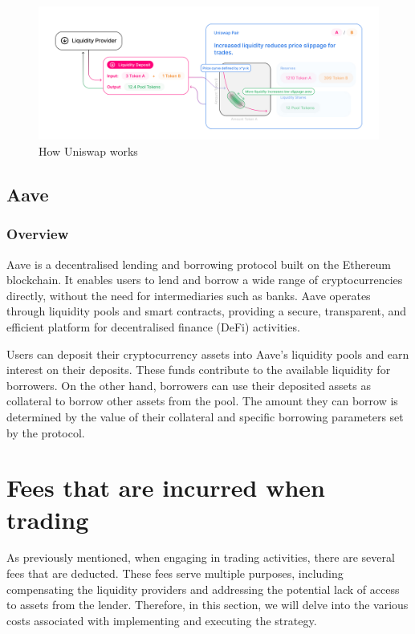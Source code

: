 \begin{figure}[!htb]
    \centering
    \includegraphics[width=\textwidth]{background/Images/uniswap_lp.jpeg}
    \caption{How Uniswap works~\cite{uniswap} \label{fig:uniswap_lp}}
\end{figure}

\subsection{Aave}

\subsubsection{Overview}
Aave is a decentralised lending and borrowing protocol built on the Ethereum blockchain. It enables users to lend and borrow a wide range of cryptocurrencies directly, without the need for intermediaries such as banks. Aave operates through liquidity pools and smart contracts, providing a secure, transparent, and efficient platform for decentralised finance (DeFi) activities.

Users can deposit their cryptocurrency assets into Aave's liquidity pools and earn interest on their deposits. These funds contribute to the available liquidity for borrowers. On the other hand, borrowers can use their deposited assets as collateral to borrow other assets from the pool. The amount they can borrow is determined by the value of their collateral and specific borrowing parameters set by the protocol.

\section{Fees that are incurred when trading}
As previously mentioned, when engaging in trading activities, there are several fees that are deducted. These fees serve multiple purposes, including compensating the liquidity providers and addressing the potential lack of access to assets from the lender. Therefore, in this section, we will delve into the various costs associated with implementing and executing the strategy.

